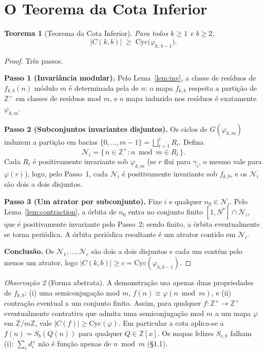 \documentclass[11pt]{article}
\newtheorem{theorem}{Teorema}[section]
\theoremstyle{definition}
\theoremstyle{remark}
\newtheorem{remark}[theorem]{Observação}
\newcommand{\Cyc}{\mathrm{Cyc}}
\begin{document}
\section{O Teorema da Cota Inferior}\label{sec:lb}

\begin{theorem}[Teorema da Cota Inferior]\label{thm:lb}
Para todos $k \ge 1$ e $b \ge 2$,
\[
|C(k,b)| \;\ge\; \Cyc\big(\varphi_{k,\,b-1}\big).
\]
\end{theorem}

\begin{proof}
Três passos.

\textbf{Passo 1 (Invariância modular).} Pelo Lema~\ref{lem:inv}, a classe de resíduos de $f_{k,b}(n)$ módulo $m$ é determinada pela de $n$: o mapa $f_{k,b}$ respeita a partição de $\mathbb{Z}^+$ em classes de resíduos mod $m$, e o mapa induzido nos resíduos é exatamente $\varphi_{k,m}$.

\textbf{Passo 2 (Subconjuntos invariantes disjuntos).} Os ciclos de $G(\varphi_{k,m})$ induzem a partição em bacias $\{0,\dots,m-1\} = \bigsqcup_{i=1}^{c} R_i$. Defina
\[
\mathcal{N}_i = \{\, n \in \mathbb{Z}^+ : n \bmod m \in R_i \,\}.
\]
Cada $R_i$ é positivamente invariante sob $\varphi_{k,m}$ (se $r$ flui para $\gamma_i$, o mesmo vale para $\varphi(r)$), logo, pelo Passo~1, cada $\mathcal{N}_i$ é positivamente invariante sob $f_{k,b}$, e os $\mathcal{N}_i$ são dois a dois disjuntos.

\textbf{Passo 3 (Um atrator por subconjunto).} Fixe $i$ e qualquer $n_0 \in \mathcal{N}_i$. Pelo Lema~\ref{lem:contraction}, a órbita de $n_0$ entra no conjunto finito $[1,N^*] \cap \mathcal{N}_i$, que é positivamente invariante pelo Passo~2; sendo finito, a órbita eventualmente se torna periódica. A órbita periódica resultante é um atrator contido em $\mathcal{N}_i$.

\textbf{Conclusão.} Os $\mathcal{N}_1,\dots,\mathcal{N}_c$ são dois a dois disjuntos e cada um contém pelo menos um atrator, logo $|C(k,b)| \ge c = \Cyc(\varphi_{k,b-1})$.
\end{proof}

\begin{remark}[Forma abstrata]\label{rem:abstract}
A demonstração usa apenas duas propriedades de $f_{k,b}$: (i) uma semiconjugação mod $m$, $f(n)\equiv\varphi(n\bmod m)$, e (ii) contração eventual a um conjunto finito. Assim, para qualquer $f:\mathbb{Z}^+\to\mathbb{Z}^+$ eventualmente contrativa que admita uma semiconjugação mod $m$ a um mapa $\varphi$ em $\mathbb{Z}/m\mathbb{Z}$, vale $|C(f)|\ge\Cyc(\varphi)$. Em particular a cota aplica-se a $f(n)=S_b(Q(n))$ para qualquer $Q\in\mathbb{Z}[x]$. Os mapas felizes $S_{e,b}$ falham (i): $\sum_i d_i^{\,e}$ não é função apenas de $n\bmod m$ (\S1.1).
\end{remark}
\end{document}
